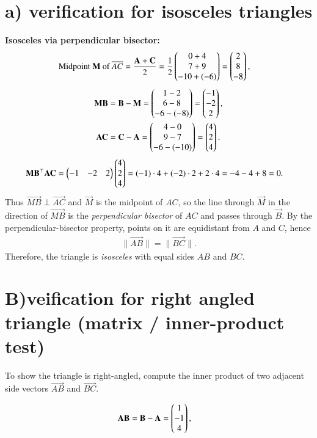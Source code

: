 \documentclass[journal]{IEEEtran}
\begin{document}
\section*{a) verification for isosceles triangles}
\textbf{Isosceles via perpendicular bisector:}
\begin{align}
\text{Midpoint } \mathbf{M} \text{ of } \overline{AC}
&= \frac{\mathbf{A}+\mathbf{C}}{2}
= \frac{1}{2}\begin{pmatrix}0+4\\7+9\\-10+(-6)\end{pmatrix}
= \begin{pmatrix}2\\8\\-8\end{pmatrix},
\end{align}
\begin{align}
\mathbf{MB} &= \mathbf{B}-\mathbf{M}
= \begin{pmatrix}1-2\\6-8\\-6-(-8)\end{pmatrix}
= \begin{pmatrix}-1\\-2\\2\end{pmatrix},\\
\mathbf{AC} &= \mathbf{C}-\mathbf{A}
= \begin{pmatrix}4-0\\9-7\\-6-(-10)\end{pmatrix}
= \begin{pmatrix}4\\2\\4\end{pmatrix}.
\end{align}
\begin{align}
\mathbf{MB}^\top \mathbf{AC}
&= \begin{pmatrix}-1 & -2 & 2\end{pmatrix}\begin{pmatrix}4\\2\\4\end{pmatrix}
= (-1)\cdot 4 + (-2)\cdot 2 + 2\cdot 4
= -4 -4 + 8
= 0.
\end{align}
Thus $\vec{MB}\perp \vec{AC}$ and $\vec{M}$ is the midpoint of $AC$, so the line through $\vec{M}$ in the direction of $\vec{MB}$ is the \emph{perpendicular bisector} of $AC$ and passes through $\vec{B}$.
By the perpendicular-bisector property, points on it are equidistant from $A$ and $C$, hence
\begin{align}
\|\vec{AB}\|=\|\vec{BC}\|.
\end{align}
Therefore, the triangle is \emph{isosceles} with equal sides $AB$ and $BC$.

\section*{B)veification for right angled triangle (matrix / inner-product test)}
To show the triangle is right-angled, compute the inner product of two adjacent side vectors $\vec{AB}$ and $\vec{BC}$.

\begin{align}
\mathbf{AB} &= \mathbf{B}-\mathbf{A} = \begin{pmatrix}1\\-1\\4\end{pmatrix},
\end{align}
\end{document}
